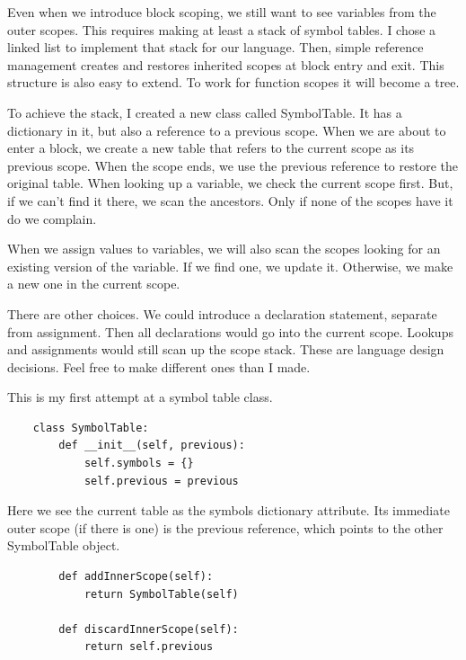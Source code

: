 Even when we introduce block scoping, we still want to see variables
from the outer scopes. This requires making at least a stack of symbol
tables. I chose a linked list to implement that stack for our language.
Then, simple reference management creates and restores inherited scopes
at block entry and exit. This structure is also easy to extend. To
work for function scopes it will become a tree.

To achieve the stack, I created a new class called SymbolTable. It has
a dictionary in it, but also a reference to a previous scope. When we
are about to enter a block, we create a new table that refers to the
current scope as its previous scope. When the scope ends, we use the previous
reference to restore the original table. When looking up a variable, we
check the current scope first. But, if we can't find it there, we scan
the ancestors. Only if none of the scopes have it do we complain.

When we assign values to variables, we will also scan the scopes looking
for an existing version of the variable. If we find one, we update it.
Otherwise, we make a new one in the current scope.

There are other choices. We could introduce a declaration statement,
separate from assignment. Then all declarations would go into the
current scope. Lookups and assignments would still scan up the scope
stack. These are language design decisions. Feel free to make different
ones than I made.

This is my first attempt at a symbol table class.


{\footnotesize
\begin{verbatim}
    class SymbolTable:
        def __init__(self, previous):
            self.symbols = {}
            self.previous = previous
\end{verbatim}
}

Here we see the current table as the symbols dictionary attribute.
Its immediate outer scope (if there is one) is the previous reference,
which points to the other SymbolTable object.

{\footnotesize
\begin{verbatim}
        def addInnerScope(self):
            return SymbolTable(self)

        def discardInnerScope(self):
            return self.previous
\end{verbatim}
}


